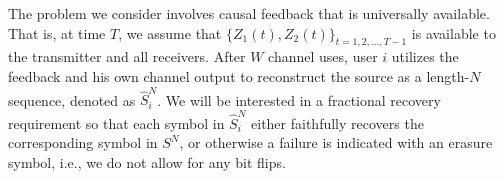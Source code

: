 %
%
%
%


The problem we consider involves causal feedback  that is universally available.  That is, at time $T$, we assume that $\{Z_1(t), Z_2(t)\}_{t=1, 2, \ldots, T-1}$ is available to the transmitter and all receivers. 
After $W$ channel uses, user $i$ utilizes the feedback and his own channel output to reconstruct the source as a length-$N$ sequence, denoted as $\hat{S}_{i}^{N}$.  We will be interested in a fractional recovery requirement so that each symbol in $\hat{S}_{i}^{N}$ either faithfully recovers the corresponding symbol in $S^{N}$, or otherwise a failure is indicated with an erasure symbol, i.e., we do not allow for any bit flips.

